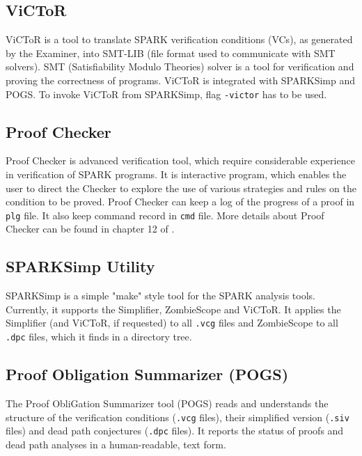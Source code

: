 \subsection{ViCToR}
\label{verification:victor}

ViCToR is a tool to translate SPARK verification conditions (VCs), as generated by the Examiner, into SMT-LIB (file format used to communicate with SMT solvers). \cite{Victor:Online} SMT (Satisfiability Modulo Theories) solver is a tool for verification and proving the correctness of programs. ViCToR is integrated with SPARKSimp and POGS. To invoke ViCToR from SPARKSimp, flag \lstinline{-victor} has to be used.



\subsection{Proof Checker}
\label{verification:proofchecker}

Proof Checker is advanced verification tool, which require considerable experience in verification of SPARK programs. It is interactive program, which enables the user to direct the Checker to explore the use of various strategies and rules on the condition to be proved. Proof Checker can keep a log of the progress of a proof in \lstinline{plg} file. It also keep command record in \lstinline{cmd} file. More details about Proof Checker can be found in chapter 12 of \cite{Barnes:Book}.



\subsection{SPARKSimp Utility}
\label{verification:sparksimp}
SPARKSimp is a simple "make" style tool for the SPARK analysis tools. Currently, it supports the Simplifier, ZombieScope and ViCToR. It applies the Simplifier (and ViCToR, if requested) to all \lstinline{.vcg} files and ZombieScope to all \lstinline{.dpc} files, which it finds in a directory tree. \cite{SPARKSimp:Online} 



\subsection{Proof Obligation Summarizer (POGS)}
\label{verification:pogs}

The Proof ObliGation Summarizer tool (POGS) reads and understands the structure of the verification conditions (\lstinline{.vcg} files), their simplified version (\lstinline{.siv} files) and dead path conjectures (\lstinline{.dpc} files). It reports the status of proofs and dead path analyses in a human-readable, text form. \cite{POGS:Online} 



